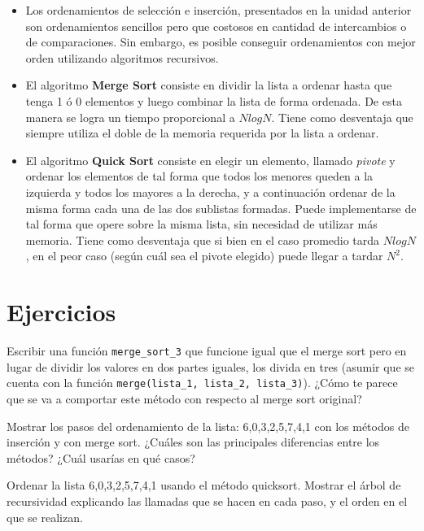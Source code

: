 \begin{itemize}

\item Los ordenamientos de selección e inserción, presentados en la unidad
anterior son ordenamientos sencillos pero que costosos en cantidad de
intercambios o de comparaciones.  Sin embargo, es posible conseguir
ordenamientos con mejor orden utilizando algoritmos recursivos.

\item El algoritmo {\bf Merge Sort} consiste en dividir la lista a ordenar
hasta que tenga 1 ó 0 elementos y luego combinar la lista de forma ordenada.
De esta manera se logra un tiempo proporcional a $N log N$.  Tiene como
desventaja que siempre utiliza el doble de la memoria requerida por la lista a
ordenar.

\item El algoritmo {\bf Quick Sort} consiste en elegir un elemento, llamado
{\it pivote} y ordenar los elementos de tal forma que todos los menores queden
a la izquierda y todos los mayores a la derecha, y a continuación ordenar de la
misma forma cada una de las dos sublistas formadas.  Puede implementarse de tal
forma que opere sobre la misma lista, sin necesidad de utilizar más memoria.
Tiene como desventaja que si bien en el caso promedio tarda $N log N$, en el
peor caso (según cuál sea el pivote elegido) puede llegar a tardar $N^2$.

\end{itemize}

\newpage
\section{Ejercicios}

\begin{ejercicio}
Escribir una función \verb!merge_sort_3! que funcione igual que el merge sort
pero en lugar de dividir los valores en dos partes iguales, los divida en tres
(asumir que se cuenta con la función \verb!merge(lista_1, lista_2, lista_3)!).
¿Cómo te parece que se va a comportar este método con respecto al merge sort
original?
\end{ejercicio}

\begin{ejercicio}
Mostrar los pasos del ordenamiento de la lista: 6,0,3,2,5,7,4,1 con
los métodos de inserción y con merge sort. ¿Cuáles son las principales
diferencias entre los métodos? ¿Cuál usarías en qué casos?
\end{ejercicio}

\begin{ejercicio}
Ordenar la lista 6,0,3,2,5,7,4,1 usando el método quicksort. Mostrar
el árbol de recursividad explicando las llamadas que se hacen en cada
paso, y el orden en el que se realizan.
\end{ejercicio}
